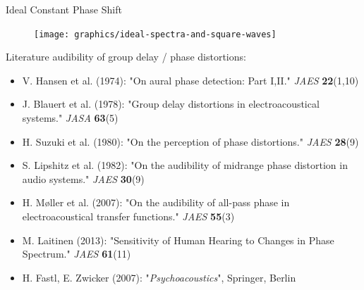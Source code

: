 \documentclass[mathserif]{intbeamer}
\begin{document}
\begin{frame}{Ideal Constant Phase Shift}
\begin{figure}
\texttt{[image: graphics/ideal-spectra-and-square-waves]}
\end{figure}
%
Literature audibility of group delay / phase distortions:

\begin{itemize}
\setlength\itemsep{-0.1em}
\scriptsize
\item V. Hansen et al. (1974):
"On aural \textcolor{colnonzero}{phase} detection: Part I,II." \textit{JAES} \textbf{22}(1,10)
\item J. Blauert  et al. (1978): "\textcolor{colnonzero}{Group delay distortions}
in electroacoustical systems."
\textit{JASA} \textbf{63}(5)
\item H. Suzuki et al. (1980): "On the perception of
\textcolor{colnonzero}{phase distortions}."
\textit{JAES} \textbf{28}(9)
\item S. Lipshitz et al. (1982): "On the audibility of
\textcolor{colnonzero}{midrange phase distortion} in audio systems."
\textit{JAES} \textbf{30}(9)
\item H. Møller et al. (2007):
"On the audibility of \textcolor{colnonzero}{all-pass phase}
in electroacoustical transfer functions."
\textit{JAES} \textbf{55}(3)
\item M. Laitinen (2013): "Sensitivity of Human Hearing to Changes in
\textcolor{colnonzero}{Phase} Spectrum." \textit{JAES} \textbf{61}(11)
\item H. Fastl, E. Zwicker (2007): "\textit{Psychoacoustics}", Springer, Berlin
\end{itemize}
\end{frame}
%
%
%
\end{document}
